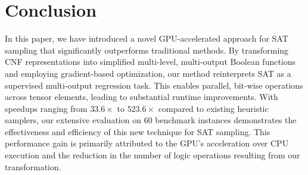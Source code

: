 \section{Conclusion}
In this paper, we have introduced a novel GPU-accelerated approach for SAT sampling that significantly outperforms traditional methods. By transforming CNF representations into simplified multi-level, multi-output Boolean functions and employing gradient-based optimization, our method reinterprets SAT as a supervised multi-output regression task. This enables parallel, bit-wise operations across tensor elements, leading to substantial runtime improvements. With speedups ranging from $33.6\times$ to $523.6\times$ compared to existing heuristic samplers, our extensive evaluation on $60$ benchmark instances demonstrates the effectiveness and efficiency of this new technique for SAT sampling. This performance gain is primarily attributed to the GPU's acceleration over CPU execution and the reduction in the number of logic operations resulting from our transformation.